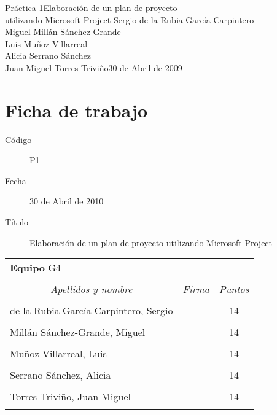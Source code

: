 \documentclass[11pt,a4paper,spanish,twoside]{book}
\begin{document}


{Práctica 1}{Elaboración de un plan de proyecto\\utilizando Microsoft Project}
{Sergio de la Rubia García-Carpintero\\Miguel Millán Sánchez-Grande\\
  Luis Muñoz Villarreal\\Alicia Serrano Sánchez\\
  Juan Miguel Torres Triviño}{30 de Abril de 2009}


\chapter*{Ficha de trabajo}
\begin{description}
\item[Código] P1
\item[Fecha] 30 de Abril de 2010
\item[Título] Elaboración de un plan de proyecto utilizando Microsoft Project
\end{description}

\begin{table}[!ht]
  \centering
  \begin{tabular}{lp{5cm}c}
    \multicolumn{3}{l}{\Large \textbf{Equipo} G4} \\ \\
    \multicolumn{1}{c}{\emph{Apellidos y nombre}} & 
    \multicolumn{1}{c}{\emph{Firma}} & \emph{Puntos} \\
    \hline \\
    de la Rubia García-Carpintero, Sergio & & 14 \\ \\
    Millán Sánchez-Grande, Miguel         & & 14 \\ \\
    Muñoz Villarreal, Luis                & & 14 \\ \\
    Serrano Sánchez, Alicia               & & 14 \\ \\
    Torres Triviño, Juan Miguel           & & 14 \\ \\
    \hline
  \end{tabular}
\end{table}
\end{document}

